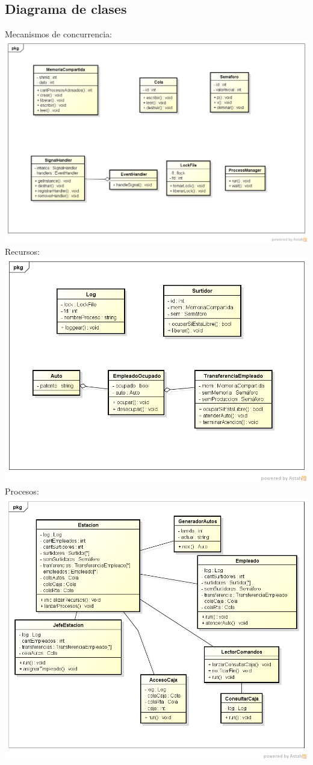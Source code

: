 \documentclass{article}
\begin{document}
\subsection{Diagrama de clases}
Mecanismos de concurrencia:
\\[1\baselineskip]
\includegraphics[width=\textwidth]{ClassDiagram0}
Recursos:
\\[1\baselineskip]
\includegraphics[width=\textwidth]{ClassDiagram1}
Procesos:
\\[1\baselineskip]
\includegraphics[width=\textwidth]{ClassDiagram2}
\end{document}
